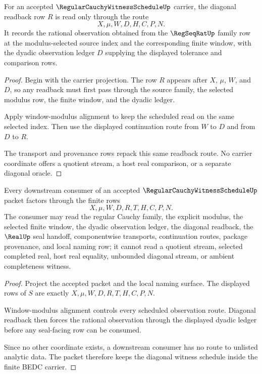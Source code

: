 \begin{theorem}
\label{thm:regular-cauchy-witness-schedule-diagonal-readback}
For an accepted $\RegularCauchyWitnessScheduleUp$ carrier, the diagonal readback row $R$ is read only through the route
$$
X,\mu,W,D,H,C,P,N.
$$
It records the rational observation obtained from the $\RegSeqRatUp$ family row at the modulus-selected source index and the corresponding finite window, with the dyadic observation ledger $D$ supplying the displayed tolerance and comparison rows.
\end{theorem}
\begin{proof}
Begin with the carrier projection. The row $R$ appears after $X$, $\mu$, $W$, and $D$, so any readback must first pass through the source family, the selected modulus row, the finite window, and the dyadic ledger.

Apply window-modulus alignment to keep the scheduled read on the same selected index. Then use the displayed continuation route from $W$ to $D$ and from $D$ to $R$.

The transport and provenance rows repack this same readback route. No carrier coordinate offers a quotient stream, a host real comparison, or a separate diagonal oracle.
\end{proof}

\begin{theorem}
\label{thm:regular-cauchy-witness-schedule-non-escape}
Every downstream consumer of an accepted $\RegularCauchyWitnessScheduleUp$ packet factors through the finite rows
$$
X,\mu,W,D,R,T,H,C,P,N.
$$
The consumer may read the regular Cauchy family, the explicit modulus, the selected finite window, the dyadic observation ledger, the diagonal readback, the $\RealUp$ seal handoff, componentwise transports, continuation routes, package provenance, and local naming row; it cannot read a quotient stream, selected completed real, host real equality, unbounded diagonal stream, or ambient completeness witness.
\end{theorem}
\begin{proof}
Project the accepted packet and the local naming surface. The displayed rows of $S$ are exactly $X,\mu,W,D,R,T,H,C,P,N$.

Window-modulus alignment controls every scheduled observation route. Diagonal readback then forces the rational observation through the displayed dyadic ledger before any seal-facing row can be consumed.

Since no other coordinate exists, a downstream consumer has no route to unlisted analytic data. The packet therefore keeps the diagonal witness schedule inside the finite BEDC carrier.
\end{proof}

